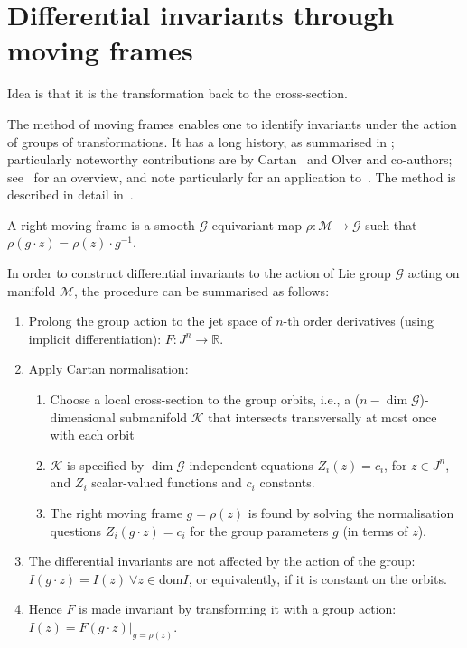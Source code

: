 \documentclass[review,onefignum,onetabnum]{siamonline190516}
\begin{document}
{\section{Differential invariants through moving frames}\label{sec:movingframes}


Idea is that it is the transformation back to the cross-section.

The method of moving frames enables one to identify invariants under the action of groups of transformations. It has a long history, as summarised in \cite{Olver14}; particularly noteworthy contributions are by Cartan~\cite{Cartan37} and Olver and co-authors; see~\cite{Olver14} for an overview, and note particularly for an application to~\cite{Calabi98}. The method is described in detail in~\cite{OlverCIT}.

A right moving frame is a smooth $\mathcal{G}$-equivariant map $\rho : \mathcal{M} \to \mathcal{G}$ such that $\rho (g \cdot z) = \rho(z) \cdot g^{-1}$. 

In order to construct differential invariants to the action of Lie group $\mathcal{G}$ acting on manifold $\mathcal{M}$, the procedure can be summarised as follows:

\begin{enumerate}
\item Prolong the group action to the jet space of $n$-th order derivatives (using implicit differentiation): $F: J^n \to \mathbb{R}$. 
\item Apply Cartan normalisation:
    \begin{enumerate}
    \item Choose a local cross-section to the group orbits, i.e., a ($n - \dim \mathcal{G}$)-dimensional submanifold $\mathcal{K}$ that intersects transversally at most once with each orbit
    \item $\mathcal{K}$ is specified by $\dim \mathcal{G}$ independent equations $Z_i (z) = c_i$, for $z \in J^n$,  and $Z_i$ scalar-valued functions and $c_i$ constants.
    \item The right moving frame $g = \rho(z)$ is found by solving the normalisation questions $Z_i (g \cdot z) = c_i$ for the group parameters $g$ (in terms of $z$).
    \end{enumerate}
\item The differential invariants are not affected by the action of the group: $I(g \cdot z) = I(z) \: \forall z \in \mathrm{dom} I$, or equivalently, if it is constant on the orbits. 
\item Hence $F$ is made invariant by transforming it with a group action: $I(z) = F(g \cdot z) |_{g=\rho(z)}$.  
\end{enumerate}

}
\end{document}
